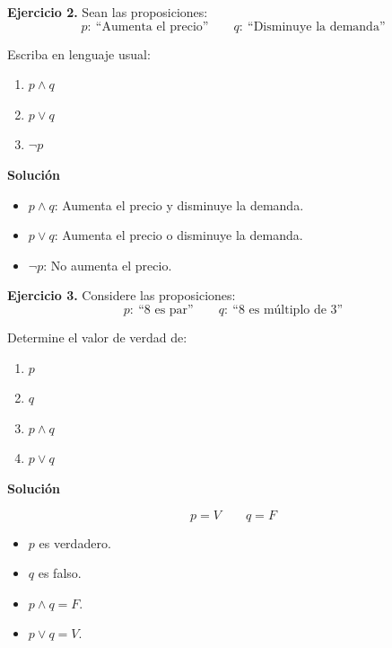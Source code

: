 \documentclass[11pt]{article}
\begin{document}
	\begin{ejercicio}
		\textbf{Ejercicio 2.} Sean las proposiciones:
		\[
		p:\ \text{``Aumenta el precio''}
		\qquad
		q:\ \text{``Disminuye la demanda''}
		\]
		
		Escriba en lenguaje usual:
		
		\begin{enumerate}[label=\alph*)]
			\item \(p \land q\)
			\item \(p \lor q\)
			\item \(\neg p\)
		\end{enumerate}
	\end{ejercicio}
	
	\begin{solucion}
		\textbf{Solución}
		
		\begin{itemize}
			\item \(p \land q\): Aumenta el precio y disminuye la demanda.
			\item \(p \lor q\): Aumenta el precio o disminuye la demanda.
			\item \(\neg p\): No aumenta el precio.
		\end{itemize}
	\end{solucion}
	
	\vspace{5mm}
	
	\begin{ejercicio}
		\textbf{Ejercicio 3.} Considere las proposiciones:
		\[
		p:\ \text{``8 es par''}
		\qquad
		q:\ \text{``8 es múltiplo de 3''}
		\]
		
		Determine el valor de verdad de:
		
		\begin{enumerate}[label=\arabic*.]
			\item \(p\)
			\item \(q\)
			\item \(p \land q\)
			\item \(p \lor q\)
		\end{enumerate}
	\end{ejercicio}
	
	\begin{solucion}
		\textbf{Solución}
		
		\[
		p = V
		\qquad
		q = F
		\]
		
		\begin{itemize}
			\item \(p\) es verdadero.
			\item \(q\) es falso.
			\item \(p \land q = F\).
			\item \(p \lor q = V\).
		\end{itemize}
	\end{solucion}
	
\end{document}

